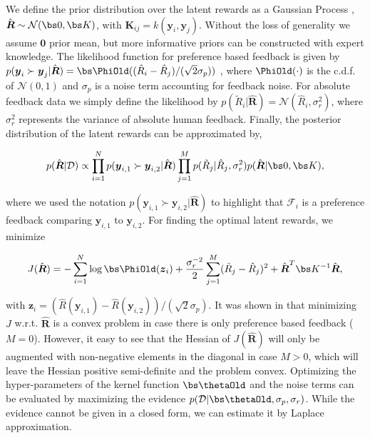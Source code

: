 We define the prior distribution over the latent rewards as a Gaussian Process \citep{Rasmussen2006}, $\hat{\boldsymbol{R}} \sim \mathcal{N}(\bs 0, \bs K)$, with
$\boldsymbol{K}_{ij} = k(  {\boldsymbol{y}} _i,   {\boldsymbol{y}} _j)$. Without the loss of generality we assume $\boldsymbol{0}$
prior mean, but more informative priors can be constructed with expert knowledge. The likelihood function for preference based feedback is given by $p(  {\boldsymbol{y}} _i \succ   {\boldsymbol{y}} _j|\hat{\boldsymbol{R}}) = \bs \boldsymbol{\PhiOld}((\hat{R}_i -
\hat{R}_j)/(\sqrt{2}\sigma_p))$ \citep{Chu_ICML_2005}, where $\boldsymbol{\boldsymbol{\PhiOld}}(\cdot)$
is the c.d.f. of $\mathcal{N}(0,1)$ and $\sigma_p$ is a noise term accounting for feedback noise. For absolute feedback data we simply define the likelihood by $p(\tilde{R}_i|\hat{\boldsymbol{R}}) = \mathcal{N}(\hat{R}_i,
\sigma_r^2)$, where $\sigma_r^2$ represents the variance of absolute human feedback. Finally, the posterior distribution of the latent rewards can be approximated by,

\begin{equation}
p(\hat{\boldsymbol{R}}|\mathcal{D}) \propto \prod_{i=1}^N p(  {\boldsymbol{y}} _{i,1} \succ   {\boldsymbol{y}} _{i, 2}|\hat{\boldsymbol{R}}) \prod_{j=1}^M p(\tilde{R}_j|\hat{R}_j,\sigma_r^2) p(\hat{\boldsymbol{R}}|\bs 0, \bs K),
\end{equation}

where we used the notation $p(  {\boldsymbol{y}} _{i,1}\succ   {\boldsymbol{y}} _{i,2}|\hat{\boldsymbol{R}})$ to highlight that $\mathcal{F}_i$ is a preference feedback comparing $  {\boldsymbol{y}} _{i,1}$ to $  {\boldsymbol{y}} _{i,2}$. For finding the optimal latent rewards, we minimize

\begin{equation}
J(\hat{\boldsymbol{R}}) = - \sum_{i=1}^N \log \bs \boldsymbol{\PhiOld} (  {\boldsymbol{z}} _i) +  \frac{\sigma_r^{-2}}{2} \sum_{j=1}^M (\tilde{R}_j - \hat{R}_j)^2 + \hat{\boldsymbol{R}}^T \bs K^{-1} \hat{\boldsymbol{R}}, \label{eq:optpref}
\end{equation}

with $  {\boldsymbol{z}} _i = (\hat{R}(  {\boldsymbol{y}} _{i,1}) - \hat{R}(  {\boldsymbol{y}} _{i,2}))/(\sqrt{2}\sigma_p)$. It was shown in \citep{Chu_ICML_2005} that minimizing $J$ w.r.t. $\hat{\boldsymbol{R}}$ is a convex problem in case there is only preference based feedback ($M=0$). However, it easy to see that the Hessian of $J(\hat{\boldsymbol{R}})$ will only be augmented with non-negative elements in the diagonal in case $M> 0$, which will leave the Hessian positive semi-definite and the problem convex. Optimizing the hyper-parameters of the kernel function $\bs \boldsymbol{\thetaOld}$ and the noise terms can be evaluated by maximizing the evidence $p(\mathcal{D}|\bs \boldsymbol{\thetaOld}, \sigma_p, \sigma_r)$. While the evidence cannot be given in a closed form, we can estimate it by Laplace approximation.

